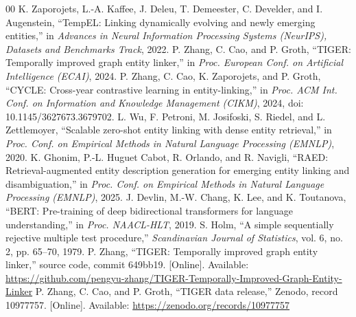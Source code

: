 \documentclass[conference]{IEEEtran}
\begin{document}
\begin{thebibliography}{00}
 K. Zaporojets, L.-A. Kaffee, J. Deleu, T. Demeester, C. Develder, and I. Augenstein,
``TempEL: Linking dynamically evolving and newly emerging entities,'' in \emph{Advances in Neural
Information Processing Systems (NeurIPS), Datasets and Benchmarks Track}, 2022.
 P. Zhang, C. Cao, and P. Groth, ``TIGER: Temporally improved graph entity linker,'' in
\emph{Proc. European Conf. on Artificial Intelligence (ECAI)}, 2024.
 P. Zhang, C. Cao, K. Zaporojets, and P. Groth, ``CYCLE: Cross-year contrastive learning
in entity-linking,'' in \emph{Proc. ACM Int. Conf. on Information and Knowledge Management (CIKM)},
2024, doi: 10.1145/3627673.3679702.
 L. Wu, F. Petroni, M. Josifoski, S. Riedel, and L. Zettlemoyer, ``Scalable zero-shot
entity linking with dense entity retrieval,'' in \emph{Proc. Conf. on Empirical Methods in Natural
Language Processing (EMNLP)}, 2020.
 K. Ghonim, P.-L. Huguet Cabot, R. Orlando, and R. Navigli, ``RAED: Retrieval-augmented
entity description generation for emerging entity linking and disambiguation,'' in \emph{Proc. Conf. on
Empirical Methods in Natural Language Processing (EMNLP)}, 2025.
 J. Devlin, M.-W. Chang, K. Lee, and K. Toutanova, ``BERT: Pre-training of deep
bidirectional transformers for language understanding,'' in \emph{Proc. NAACL-HLT}, 2019.
 S. Holm, ``A simple sequentially rejective multiple test procedure,''
\emph{Scandinavian Journal of Statistics}, vol. 6, no. 2, pp. 65--70, 1979.
 P. Zhang, ``TIGER: Temporally improved graph entity linker,'' source code,
commit 649bb19. [Online]. Available:
\url{https://github.com/pengyu-zhang/TIGER-Temporally-Improved-Graph-Entity-Linker}
 P. Zhang, C. Cao, and P. Groth, ``TIGER data release,'' Zenodo, record 10977757.
[Online]. Available: \url{https://zenodo.org/records/10977757}
\end{thebibliography}
\end{document}
